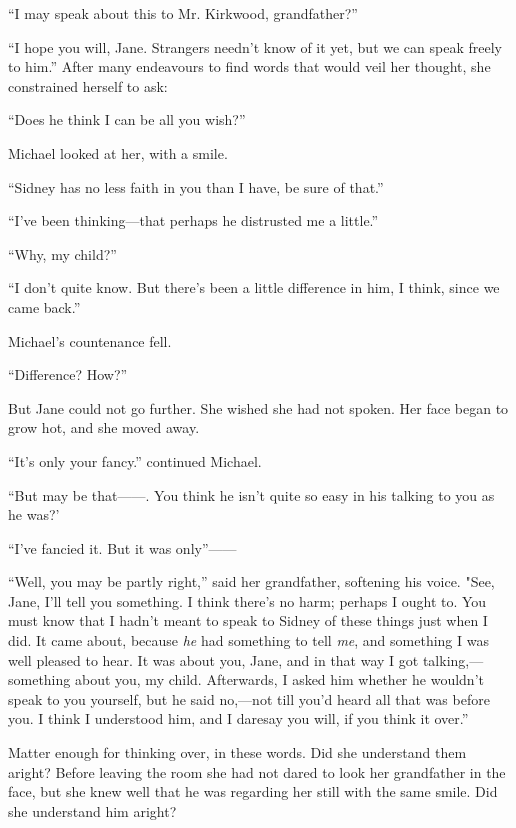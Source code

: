 {\protect\hypertarget{250}{}{}}``I may speak about this to Mr. Kirkwood,
grandfather?''

``I hope you will, Jane. Strangers needn't know of it yet, but we can
speak freely to him.'' After many endeavours to find words that would
veil her thought, she constrained herself to ask:

``Does he think I can be all you wish?''

Michael looked at her, with a smile.

``Sidney has no less faith in you than I have, be sure of that.''

``I've been thinking---that perhaps he distrusted me a little.''

``Why, my child?''

``I don't quite know. But there's been a little difference in him, I
think, since we came back.''

Michael's countenance fell.

``Difference? How?''

But Jane could not go further. She wished she had not spoken. Her face
began to grow hot, and she moved away.

``It's only your fancy.'' continued Michael.

{\protect\hypertarget{251}{}{}}``But may be {that{{------}}.} You think
he isn't quite so easy in his talking to you as he was?'

``I've fancied it. But it was {only''{{------}}}

``Well, you may be partly right,'' said her grandfather, softening his
voice. "See, Jane, I'll tell you something. I think there's no harm;
perhaps I ought to. You must know that I hadn't meant to speak to Sidney
of these things just when I did. It came about, because \emph{he} had
something to tell \emph{me}, and something I was well pleased to hear.
It was about you, Jane, and in that way I got talking,---something about
you, my child. Afterwards, I asked him whether he wouldn't speak to you
yourself, but he said no,---not till you'd heard all that was before
you. I think I understood him, and I daresay you will, if you think it
over.''

Matter enough for thinking over, in these words. Did she understand them
aright? Before leaving the room she had not dared to look her
grandfather in the face, but she knew well that he was regarding her
still with the same smile. Did she understand him aright?

